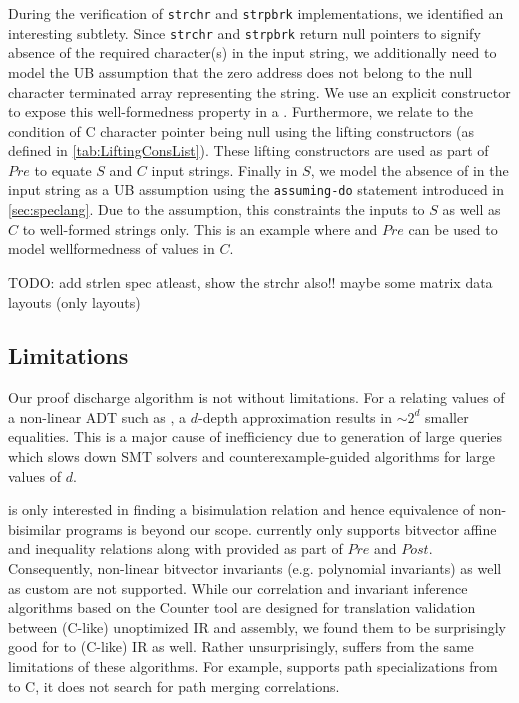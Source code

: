 During the verification of {\tt strchr} and {\tt strpbrk} implementations,
we identified an interesting subtlety. Since {\tt strchr} and {\tt strpbrk}
return null pointers to signify absence of the required character(s) in the input string,
we additionally need to model the UB assumption that the zero
address does not belong to the null character terminated array representing the string.
We use an explicit constructor  to expose this well-formedness property in a \SpecL{} .
Furthermore, we relate  to the condition of C character pointer being null using the
lifting constructors  (as defined in \cref{tab:LiftingConsList}).
These lifting constructors are used as part of $Pre$ to equate $S$ and $C$ input strings.
Finally in $S$, we model the absence of  in the input string as a UB assumption using
the {\tt assuming-do} statement introduced in \cref{sec:speclang}.
Due to the \sdef{} assumption, this constraints the inputs to $S$ as well as $C$ to well-formed strings only.
This is an example where \sdef{} and $Pre$ can be used to model wellformedness of values in $C$.

TODO: add strlen spec atleast, show the strchr also!! maybe some matrix data layouts (only layouts)

\subsection{Limitations}
\label{sec:limitations}
Our proof discharge algorithm is not without limitations.
For a \recursiveRelation{} relating values of a non-linear ADT such as , a $d$-depth
approximation results in $\sim 2^d$ smaller equalities. This is a major cause of inefficiency due to
generation of large queries which slows down SMT solvers and counterexample-guided algorithms for large values of $d$.

\toolName{} is only interested in finding a bisimulation relation and hence
equivalence of non-bisimilar programs is beyond our scope.
\toolName{} currently only supports bitvector affine and inequality relations
along with \recursiveRelations{} provided as part of $Pre$ and $Post$.
Consequently, non-linear bitvector invariants (e.g. polynomial invariants)
as well as custom \recursiveRelations{} are not supported.
While our correlation and invariant inference algorithms based on the Counter tool \cite{oopsla20}
are designed for translation validation between (C-like) unoptimized IR and assembly, we found them
to be surprisingly good for \SpecL{} to (C-like) IR as well. Rather unsurprisingly, \toolName{}
suffers from the same limitations of these algorithms. For example, \toolName{} supports path
specializations from \SpecL{} to C, it does not search for path merging correlations.